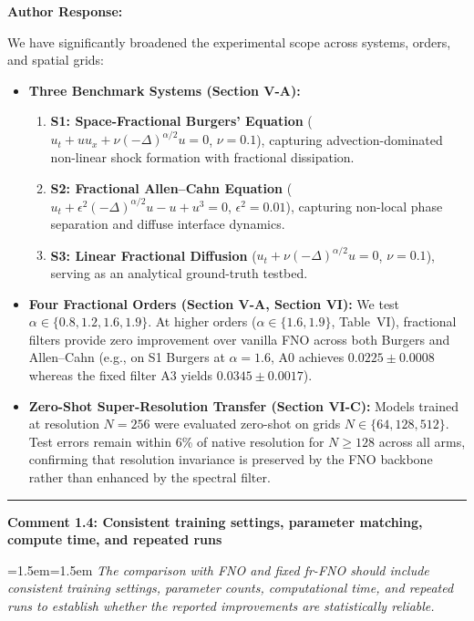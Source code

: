 \documentclass[11pt,a4paper]{article}
\newcommand{\revcomment}[2]{%
  \vspace{3mm}\par\noindent
  \textbf{\color{navyblue}#1}\par\vspace{1.5mm}
  \begingroup
  \leftskip=1.5em\rightskip=1.5em
  \small\itshape\color{commentgray}
  #2\par
  \endgroup
  \vspace{2mm}
}
\newenvironment{authorresponse}{%
  \vspace{1mm}\par\noindent
  \textbf{\color{navyblue}Author Response:}\par\vspace{1.5mm}
}{%
  \vspace{3mm}\par\noindent\rule{\textwidth}{0.3pt}\vspace{2mm}
}
\begin{document}
\begin{authorresponse}
We have significantly broadened the experimental scope across systems, orders, and spatial grids:
\begin{itemize}
  \item \textbf{Three Benchmark Systems (Section V-A):}
  \begin{enumerate}
    \item \textbf{S1: Space-Fractional Burgers' Equation} ($u_t + u u_x + \nu (-\Delta)^{\alpha/2} u = 0$, $\nu = 0.1$), capturing advection-dominated non-linear shock formation with fractional dissipation.
    \item \textbf{S2: Fractional Allen--Cahn Equation} ($u_t + \epsilon^2 (-\Delta)^{\alpha/2} u - u + u^3 = 0$, $\epsilon^2 = 0.01$), capturing non-local phase separation and diffuse interface dynamics.
    \item \textbf{S3: Linear Fractional Diffusion} ($u_t + \nu (-\Delta)^{\alpha/2} u = 0$, $\nu = 0.1$), serving as an analytical ground-truth testbed.
  \end{enumerate}
  \item \textbf{Four Fractional Orders (Section V-A, Section VI):} We test $\alpha \in \{0.8, 1.2, 1.6, 1.9\}$. At higher orders ($\alpha \in \{1.6, 1.9\}$, Table~VI), fractional filters provide zero improvement over vanilla FNO across both Burgers and Allen--Cahn (e.g., on S1 Burgers at $\alpha=1.6$, A0 achieves $0.0225 \pm 0.0008$ whereas the fixed filter A3 yields $0.0345 \pm 0.0017$).
  \item \textbf{Zero-Shot Super-Resolution Transfer (Section VI-C):} Models trained at resolution $N=256$ were evaluated zero-shot on grids $N \in \{64, 128, 512\}$. Test errors remain within 6\% of native resolution for $N \ge 128$ across all arms, confirming that resolution invariance is preserved by the FNO backbone rather than enhanced by the spectral filter.
\end{itemize}
\end{authorresponse}

\revcomment{Comment 1.4: Consistent training settings, parameter matching, compute time, and repeated runs}{The comparison with FNO and fixed fr-FNO should include consistent training settings, parameter counts, computational time, and repeated runs to establish whether the reported improvements are statistically reliable.}
\end{document}

